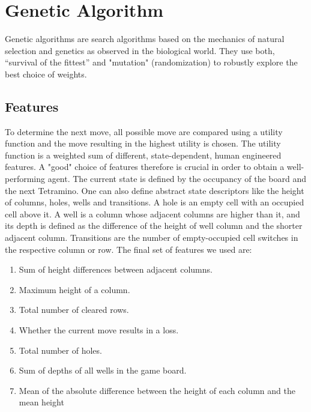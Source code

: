 \section{Genetic Algorithm}
\label{sec:genetic}
\vspace{-0.45cm}
Genetic algorithms are search algorithms based on the mechanics of natural selection and genetics as observed in the biological world. They use both, “survival of the fittest” and "mutation" (randomization) to robustly explore the best choice of weights.

\vspace{-0.4cm}
\subsection{Features}
To determine the next move, all possible move are compared using a utility function and the move resulting in the highest utility is chosen. The utility function is a weighted sum of different, state-dependent, human engineered features. A "good" choice of features therefore is crucial in order to obtain a well-performing agent.
\newline 
The current state is defined by the occupancy of the board and the next Tetramino. One can also define abstract state descriptors like the height of columns, holes, wells and transitions. A hole is an empty cell with an occupied cell above it. A well is a column whose adjacent columns are higher than it, and its depth is defined as the difference of the height of well column and the shorter adjacent column. Transitions are the number of empty-occupied cell switches in the respective column or row. The final set of features we used are: 

\begin{enumerate}
\itemsep0em 
\item Sum of height differences between adjacent columns.
\item Maximum height of a column.
\item Total number of cleared rows.
\item Whether the current move results in a loss.
\item Total number of holes. 
\item Sum of depths of all wells in the game board.
\item Mean of the absolute difference between the height of each column and the mean height
\end{enumerate}
\vspace{-0.45cm}
